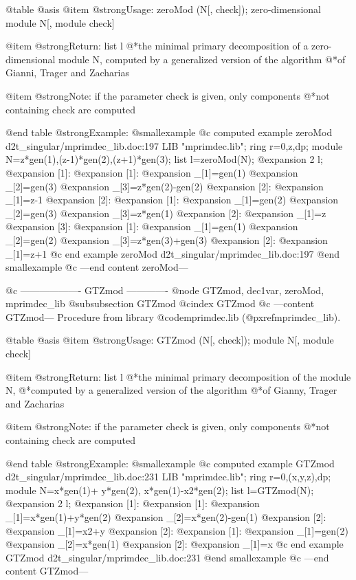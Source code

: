 @table @asis
@item @strong{Usage:}
zeroMod (N[, check]); zero-dimensional module N[, module check]

@item @strong{Return:}
list l
@*the minimal primary decomposition of a zero-dimensional module N,
computed by a generalized version of the algorithm
@*of Gianni, Trager and Zacharias

@item @strong{Note:}
if the parameter check is given, only components
@*not containing check are computed

@end table
@strong{Example:}
@smallexample
@c computed example zeroMod d2t_singular/mprimdec_lib.doc:197 
LIB "mprimdec.lib";
ring r=0,z,dp;
module N=z*gen(1),(z-1)*gen(2),(z+1)*gen(3);
list l=zeroMod(N);
@expansion{} 2
l;
@expansion{} [1]:
@expansion{}    [1]:
@expansion{}       _[1]=gen(1)
@expansion{}       _[2]=gen(3)
@expansion{}       _[3]=z*gen(2)-gen(2)
@expansion{}    [2]:
@expansion{}       _[1]=z-1
@expansion{} [2]:
@expansion{}    [1]:
@expansion{}       _[1]=gen(2)
@expansion{}       _[2]=gen(3)
@expansion{}       _[3]=z*gen(1)
@expansion{}    [2]:
@expansion{}       _[1]=z
@expansion{} [3]:
@expansion{}    [1]:
@expansion{}       _[1]=gen(1)
@expansion{}       _[2]=gen(2)
@expansion{}       _[3]=z*gen(3)+gen(3)
@expansion{}    [2]:
@expansion{}       _[1]=z+1
@c end example zeroMod d2t_singular/mprimdec_lib.doc:197
@end smallexample
@c ---end content zeroMod---

@c ------------------- GTZmod -------------
@node GTZmod, dec1var, zeroMod, mprimdec_lib
@subsubsection GTZmod
@cindex GTZmod
@c ---content GTZmod---
Procedure from library @code{mprimdec.lib} (@pxref{mprimdec_lib}).

@table @asis
@item @strong{Usage:}
GTZmod (N[, check]); module N[, module check]

@item @strong{Return:}
list l
@*the minimal primary decomposition of the module N,
@*computed by a generalized version of the algorithm
@*of Gianny, Trager and Zacharias

@item @strong{Note:}
if the parameter check is given, only components
@*not containing check are computed

@end table
@strong{Example:}
@smallexample
@c computed example GTZmod d2t_singular/mprimdec_lib.doc:231 
LIB "mprimdec.lib";
ring r=0,(x,y,z),dp;
module N=x*gen(1)+ y*gen(2),
x*gen(1)-x2*gen(2);
list l=GTZmod(N);
@expansion{} 2
l;
@expansion{} [1]:
@expansion{}    [1]:
@expansion{}       _[1]=x*gen(1)+y*gen(2)
@expansion{}       _[2]=x*gen(2)-gen(1)
@expansion{}    [2]:
@expansion{}       _[1]=x2+y
@expansion{} [2]:
@expansion{}    [1]:
@expansion{}       _[1]=gen(2)
@expansion{}       _[2]=x*gen(1)
@expansion{}    [2]:
@expansion{}       _[1]=x
@c end example GTZmod d2t_singular/mprimdec_lib.doc:231
@end smallexample
@c ---end content GTZmod---

